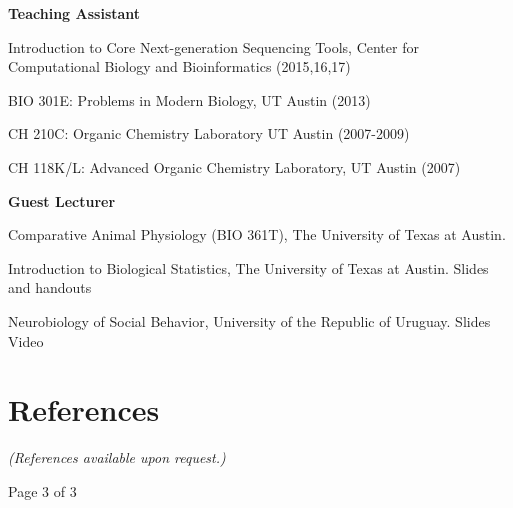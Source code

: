 \documentclass[margin,line]{resume}
\begin{document}
\begin{resume}
{\bf Teaching Assistant}
\begin{list1}
\item[] Introduction to Core Next-generation Sequencing Tools, Center for Computational Biology and Bioinformatics (2015,16,17)
\item[] BIO 301E: Problems in Modern Biology, UT Austin (2013)
\item[] CH 210C: Organic Chemistry Laboratory UT Austin (2007-2009)
\item[] CH 118K/L: Advanced Organic Chemistry Laboratory, UT Austin (2007)
\end{list1}

{\bf Guest Lecturer}
\begin{list1}
\item[] Comparative Animal Physiology (BIO 361T), The University of Texas at Austin. 
\item[] Introduction to Biological Statistics, The University of Texas at Austin. Slides and handouts 
\item[] Neurobiology of Social Behavior, University of the Republic of Uruguay. Slides Video
\end{list1}

\section{\mysidestyle References}

{\em (References available upon request.)}


\vspace{3cm}
{\centerline {Page 3 of 3}}

\end{resume}
\end{document}
